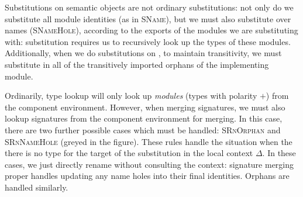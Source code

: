 Substitutions on semantic objects are not ordinary substitutions: not
only do we substitute all module identities (as in
\textsc{SName}), but we must also substitute over names
(\textsc{SNameHole}), according to the exports of the modules we are
substituting with: substitution requires us to recursively look up the
types of these modules.  Additionally, when we do substitutions on
, to maintain transitivity, we must substitute in all of
the transitively imported orphans of the implementing module.


Ordinarily, type lookup will only look up \emph{modules} (types
with polarity $+$) from the component environment.  However, when merging
signatures, we must also lookup signatures from the component environment
for merging.  In this case, there are two further possible cases which
must be handled: \textsc{SRnOrphan} and \textsc{SRnNameHole} (greyed in
the figure).  These rules handle the situation when the there is no
type for the target of the substitution in the local context $\Delta$.
In these cases, we just directly rename without consulting the context:
signature merging proper handles updating any name holes into their
final identities.  Orphans are handled similarly.



